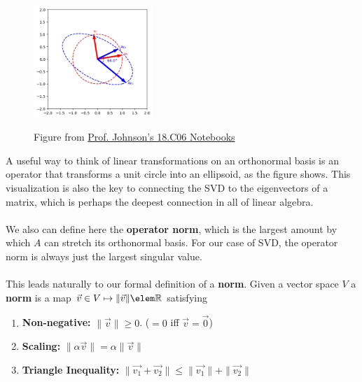 \documentclass[11pt]{article}
\begin{document}
\begin{ideabox}
	\begin{figure}
	    \includegraphics[width=0.4\textwidth]{figs/ellipse.png}

		\footnotesize \centering Figure from \href{https://nbviewer.org/github/mitmath/1806/blob/fall22/notes/SVD-intro.ipynb}{Prof. Johnson's 18.C06 Notebooks}
	\end{figure}
	\ndent A useful way to think of linear transformations on an orthonormal basis is an operator that transforms a unit circle into an ellipsoid, as the figure shows. This visualization is also the key to connecting the SVD to the eigenvectors of a matrix, which is perhaps the deepest connection in all of linear algebra. 
	\\\\
\noindent We also can define here the \textbf{operator norm}, which is the largest amount by which $A$ can stretch its orthonormal basis. For our case of SVD, the operator norm is always just the largest singular value. \\ \\
\noindent This leads naturally to our formal definition of a \textbf{norm}. 
	Given a vector space $V$ a \textbf{norm} is a map $\vec{v} \in V \mapsto \|\vec{v}\| \elem \mathbb{R}$ satisfying
	\begin{enumerate}
		\item	\textbf{Non-negative: }$ \|\vec{v}\| \geq 0$. ($=0$ iff $\vec{v}=\vec{0}$) 
		\item \textbf{Scaling: }$ \|\alpha \vec{v}\| = \alpha \|\vec{v}\|$
		\item \textbf{Triangle Inequality: } $\|\vec{v_1} + \vec{v_2}\| \leq \|\vec{v_1}\| + \|\vec{v_2}\|$
	\end{enumerate}
\end{ideabox}
\end{document}

